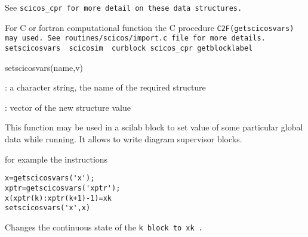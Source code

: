 See %
\tt scicos\_cpr %
\rm for more detail on these data structures.
\par\noindent
For C or fortran computational function the C procedure
%
\tt C2F(getscicosvars) %
\rm may used. See
%
\tt routines/scicos/import.c %
\rm file for more details.
{\verb?setscicosvars  scicosim  curblock scicos_cpr getblocklabel?} \pageref{setscicosvarsscicosimcurblockscicoscprgetblocklabel}
%
%


\label{setscicosvars}

setscicosvars(name,v)
\begin{scitem}
\item[{\verb?name?}]
: a character string, the name of the required structure
\item[{\verb?v ?}]
: vector of the new structure value
\end{scitem}%
This function may be used in a scilab block to set value of some
particular global data while running. It allows to write diagram
supervisor blocks.
\par\noindent
for example  the instructions  
\begin{verbatim}
x=getscicosvars('x');
xptr=getscicosvars('xptr');
x(xptr(k):xptr(k+1)-1)=xk
setscicosvars('x',x)
\end{verbatim}
Changes the continuous state of the %
\tt k %
\rm block to %
\tt xk%
\rm .

